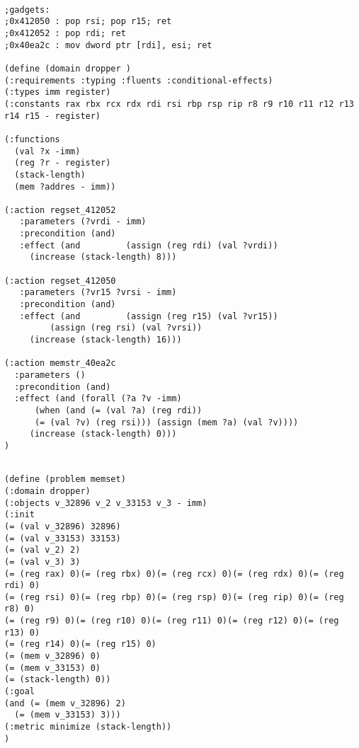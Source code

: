 \begin{lstlisting}

;gadgets: 
;0x412050 : pop rsi; pop r15; ret
;0x412052 : pop rdi; ret
;0x40ea2c : mov dword ptr [rdi], esi; ret

(define (domain dropper )
(:requirements :typing :fluents :conditional-effects)
(:types imm register)
(:constants rax rbx rcx rdx rdi rsi rbp rsp rip r8 r9 r10 r11 r12 r13 r14 r15 - register)

(:functions 
  (val ?x -imm)
  (reg ?r - register)
  (stack-length)
  (mem ?addres - imm))

(:action regset_412052
   :parameters (?vrdi - imm)
   :precondition (and)
   :effect (and         (assign (reg rdi) (val ?vrdi))
     (increase (stack-length) 8)))

(:action regset_412050
   :parameters (?vr15 ?vrsi - imm)
   :precondition (and)
   :effect (and         (assign (reg r15) (val ?vr15))
         (assign (reg rsi) (val ?vrsi))
     (increase (stack-length) 16)))

(:action memstr_40ea2c
  :parameters ()
  :precondition (and)
  :effect (and (forall (?a ?v -imm) 
      (when (and (= (val ?a) (reg rdi))
      (= (val ?v) (reg rsi))) (assign (mem ?a) (val ?v))))
     (increase (stack-length) 0)))
)


\end{lstlisting}
\label{pddl:domain}


\begin{lstlisting}
(define (problem memset)
(:domain dropper)
(:objects v_32896 v_2 v_33153 v_3 - imm)
(:init
(= (val v_32896) 32896)
(= (val v_33153) 33153)
(= (val v_2) 2)
(= (val v_3) 3)
(= (reg rax) 0)(= (reg rbx) 0)(= (reg rcx) 0)(= (reg rdx) 0)(= (reg rdi) 0)
(= (reg rsi) 0)(= (reg rbp) 0)(= (reg rsp) 0)(= (reg rip) 0)(= (reg r8) 0)
(= (reg r9) 0)(= (reg r10) 0)(= (reg r11) 0)(= (reg r12) 0)(= (reg r13) 0)
(= (reg r14) 0)(= (reg r15) 0)
(= (mem v_32896) 0)
(= (mem v_33153) 0)
(= (stack-length) 0))
(:goal 
(and (= (mem v_32896) 2)
  (= (mem v_33153) 3)))
(:metric minimize (stack-length))
)
\end{lstlisting}
\label{pddl:facts}



